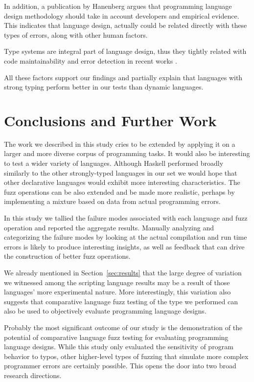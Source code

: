 \documentclass[10pt]{sigplanconf}
\begin{document}
In addition, a publication by Hanenberg \cite{HANE10} argues that programming 
language design methodology should take in account developers and empirical evidence.
This indicates that language design, actually could be related directly with 
these types of errors, along with other human factors.

Type systems are integral part of language design, thus they tightly related with
code maintainability and error detection in recent works \cite{STHA11,KHRT12}.

All these factors support our findings and partially explain that languages with
strong typing perform better in our tests than dynamic languages.

\section{Conclusions and Further Work} %
\label{sec:conclusions}

The work we described in this study cries to be extended
by applying it on a larger and more diverse corpus of programming tasks.
It would also be interesting to test a wider variety of languages.
Although Haskell performed broadly similarly to the other strongly-typed
languages in our set we would hope that other declarative languages
would exhibit more interesting characteristics.
The fuzz operations can be also extended and be made more realistic,
perhaps by implementing a mixture based on data from actual programming
errors.

In this study we tallied the failure modes associated with each
language and fuzz operation and reported the aggregate results.
Manually analyzing and categorizing the failure modes by looking
at the actual compilation and run time errors
is likely to produce interesting insights,
as well as feedback that can drive the
construction of better fuzz operations.

We already mentioned in Section~\ref{sec:results} that the
large degree of variation we witnessed among the scripting
language results may be a result of those languages'
more experimental nature.
More interestingly, this variation also suggests that
comparative language fuzz testing of the type we performed
can also be used to objectively evaluate programming language
designs.

Probably the most significant outcome of our study is the
demonstration of the potential of comparative language fuzz testing
for evaluating programming language designs.
While this study only evaluated the sensitivity of program behavior to typos,
other higher-level types of fuzzing
that simulate more complex programmer errors are certainly possible.
This opens the door into two broad research directions.
\end{document}

